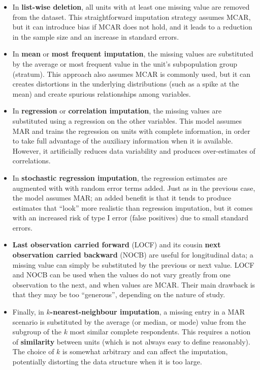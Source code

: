 \begin{itemize}[noitemsep]
\item In \textbf{list-wise deletion}, all units with at least one missing value are removed from the dataset. This straightforward imputation strategy assumes MCAR, but it can introduce bias if MCAR does not hold, and it leads to a reduction in the sample size and an increase in standard errors.
\item In \textbf{mean} or \textbf{most frequent imputation}, the missing values are substituted by the average or most frequent value in the unit's subpopulation group (stratum). This approach also assumes MCAR is commonly used, but it can creates distortions in the underlying distributions (such as a spike at the mean) and create spurious relationships among variables.
\item  In \textbf{regression} or \textbf{correlation imputation}, the missing values are substituted using a regression on the other variables. This model assumes MAR and trains the regression on units with complete information, in order to take full advantage of the auxiliary information when it is available. However, it artificially reduces data variability and produces over-estimates of correlations.
\item In \textbf{stochastic regression imputation}, the regression estimates are augmented with with random error terms added. Just as in the previous case, the model assumes MAR; an added benefit is that it tends to produce estimates that ``look'' more realistic than regression imputation, but it comes with an increased risk of type I error (false positives) due to small standard errors.
\item\textbf{Last observation carried forward} (LOCF) and its cousin \textbf{next observation carried backward} (NOCB) are useful for longitudinal data; a missing value can simply be substituted by the previous or next value. LOCF and NOCB can be used when the values do not vary greatly from one observation to the next, and when values are MCAR. Their main drawback is that they may be too ``generous'', depending on the nature of study. 
\item Finally, in \textbf{$k$-nearest-neighbour imputation}, a missing entry in a MAR scenario is substituted by the average (or median, or mode) value from the subgroup of the $k$ most similar complete respondents. This requires a notion of \textbf{similarity} between units (which is not always easy to define reasonably). The choice of $k$ is somewhat arbitrary and can affect the imputation, potentially distorting the data structure when it is too  large. 
\end{itemize}
